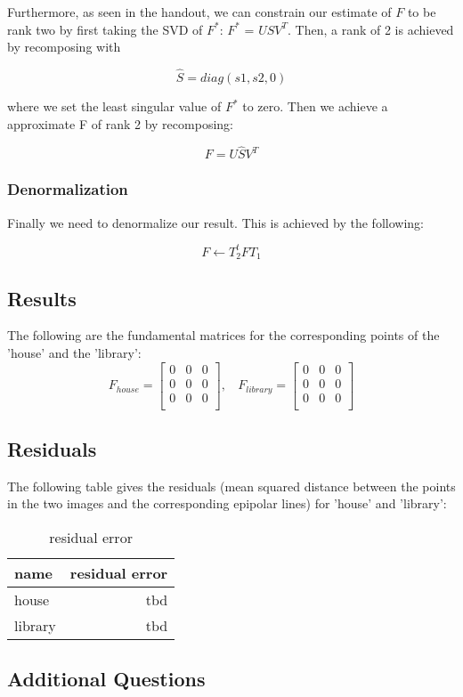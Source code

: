 \noindent Furthermore, as seen in the handout, we can constrain our estimate of $F$ to be rank two by first taking the SVD of $F^{*}$: $F^{*}$ = $U S V^{T}$. Then, a rank of 2 is achieved by recomposing with 

$$
\hat{S} = diag(s1, s2, 0)
$$

\noindent where we set the least singular value of $F^{*}$ to zero. Then we achieve a approximate F of rank 2 by recomposing:

$$
F = U\hat{S}V^{T}
$$

\subsubsection{Denormalization}
Finally we need to denormalize our result. This is achieved by the following:

$$
F \leftarrow T_{2}^{t} F T_{1} 
$$

\subsection{Results}
The following are the fundamental matrices for the corresponding points of the 'house' and the 'library':
$$
F_{house} = 
\begin{bmatrix}
0 & 0 & 0 \\
0 & 0 & 0 \\
0 & 0 & 0 \\ 
\end{bmatrix}, \ \ \ \ 
F_{library} = 
\begin{bmatrix}
0 & 0 & 0 \\
0 & 0 & 0 \\
0 & 0 & 0 \\ 
\end{bmatrix}
$$

\subsection{Residuals}
The following table gives the residuals (mean squared distance between
the points in the two images and the corresponding epipolar lines) for 'house' and 'library':

\begin{table}[H]
\begin{center}
\begin{tabular}{|l|r|}
\hline
name & residual error\\
\hline
house & tbd \\
\hline 
library & tbd \\
\hline
\end{tabular}
\caption{residual error}
\label{Table:res_err}
\end{center}
\end{table}

\subsection{Additional Questions}